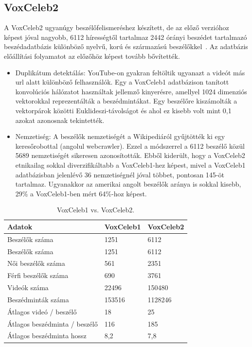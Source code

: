 \subsection{VoxCeleb2} \label{voxceleb2}

A VoxCeleb2 ugyanúgy beszélőfelismeréshez készített, de az előző verzióhoz képest jóval nagyobb, 6112 hírességtől tartalmaz 2442 órányi beszédet tartalmazó beszédadatbázis különböző nyelvű, korú és származású beszélőkkel~\cite{voxceleb2}.
\newline
\newline
Az adatbázis előállítási folyamatot az előzőhöz képest tovább bővítették.
\begin{itemize}
	\item Duplikátum detektálás: YouTube-on gyakran feltöltik ugyanazt a videót más url alatt különböző felhasználók. Egy a VoxCeleb1 adatbázison tanított konvolúciós hálózatot használtak jellemző kinyerésre, amellyel 1024 dimenziós vektorokkal reprezentálták a beszédmintákat. Egy beszélőre kiszámolták a vektorpárok közötti Euklideszi-távolságot és ahol ez kisebb volt mint 0,1 azokat azonosnak tekintették.
	\item Nemzetiség: A beszélők nemzetiségét a Wikipediáról gyűjtötték ki egy keresőrobottal (angolul webcrawler). Ezzel a módszerrel a 6112 beszélő közül 5689 nemzetiségét sikeresen azonosították. Ebből kiderült, hogy a VoxCeleb2 etnikailag sokkal diverzifikáltabb a VoxCeleb1-hez képest, mivel a VoxCeleb1 adatbázisban jelenlévő 36 nemzetiségnél jóval többet, pontosan 145-öt tartalmaz. Ugyanakkor az amerikai angolt beszélők aránya is sokkal kisebb, 29\% a VoxCeleb1-ben mért 64\%-hoz képest.
\end{itemize}

\begin{table}[!ht]
	\begin{tabular}{*3l} \toprule
		\bfseries Adatok & \bfseries VoxCeleb1 & \bfseries VoxCeleb2 \\ \midrule
		Beszélők száma   & 1251 & 6112 \\
		\rowcolor{gray!10} 
		Beszélők száma   & 1251 & 6112 \\
		Női beszélők száma & 561 & 2351 \\
		\rowcolor{gray!10}
		Férfi beszélők száma & 690 & 3761 \\
		Videók száma & 22496 & 150480 \\
		\rowcolor{gray!10}
		Beszédminták száma & 153516 & 1128246 \\
		Átlagos videó / beszélő & 18 & 25 \\
		\rowcolor{gray!10}
		Átlagos beszédminta / beszélő & 116 & 185 \\
		Átlagos beszédminta hossz & 8,2 & 7,8 \\
		\bottomrule
		\hline
	\end{tabular}
	\centering
	\caption{VoxCeleb1 vs. VoxCeleb2.}
	\label{fig:voxceleb1-vs-2}
\end{table}

